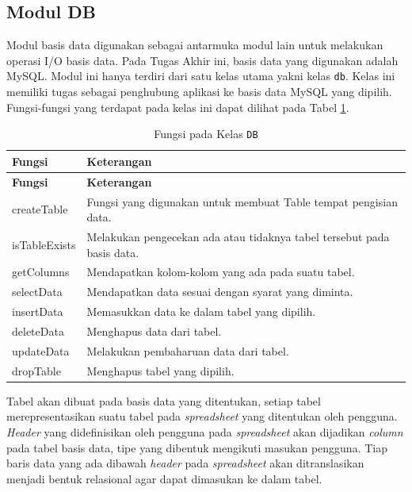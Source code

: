 	\subsection{Modul DB}
	Modul basis data digunakan sebagai antarmuka modul lain untuk melakukan operasi I/O basis data. Pada Tugas Akhir ini, basis data yang digunakan adalah MySQL. Modul ini hanya terdiri dari satu kelas utama yakni kelas \texttt{db}. Kelas ini memiliki tugas sebagai penghubung aplikasi ke basis data MySQL yang dipilih. Fungsi-fungsi yang terdapat pada kelas ini dapat dilihat pada Tabel \ref{FungsiModulDB}.

	\begin{small}
	\begin{longtable}{ | p{2cm} | p{10cm} | }
	    \caption{Fungsi pada Kelas \texttt{DB}}
	    \label{FungsiModulDB}\\ \hline
	    \centering\bfseries{Fungsi} & \centering\bfseries{Keterangan} \tabularnewline \hline
	    \endfirsthead
	    \hline
	    \centering\bfseries{Fungsi} & \centering\bfseries{Keterangan} \tabularnewline \hline
	    \endhead
	    createTable & Fungsi yang digunakan untuk membuat Table tempat pengisian data.\\ \hline
	    isTableExists & Melakukan pengecekan ada atau tidaknya tabel tersebut pada basis data.\\ \hline
	    getColumns & Mendapatkan kolom-kolom yang ada pada suatu tabel.\\ \hline
	    selectData & Mendapatkan data sesuai dengan syarat yang diminta.\\ \hline
	    insertData & Memasukkan data ke dalam tabel yang dipilih.\\ \hline
	    deleteData & Menghapus data dari tabel.\\ \hline
	    updateData & Melakukan pembaharuan data dari tabel.\\ \hline
	    dropTable & Menghapus tabel yang dipilih.\\ \hline
	\end{longtable}
	\end{small}

	Tabel akan dibuat pada basis data yang ditentukan, setiap tabel merepresentasikan suatu tabel pada \textit{spreadsheet} yang ditentukan oleh pengguna. \textit{Header} yang didefinisikan oleh pengguna pada \textit{spreadsheet} akan dijadikan \textit{column} pada tabel basis data, tipe yang dibentuk mengikuti masukan pengguna. Tiap baris data yang ada dibawah \textit{header} pada \textit{spreadsheet} akan ditranslasikan menjadi bentuk relasional agar dapat dimasukan ke dalam tabel.
	

